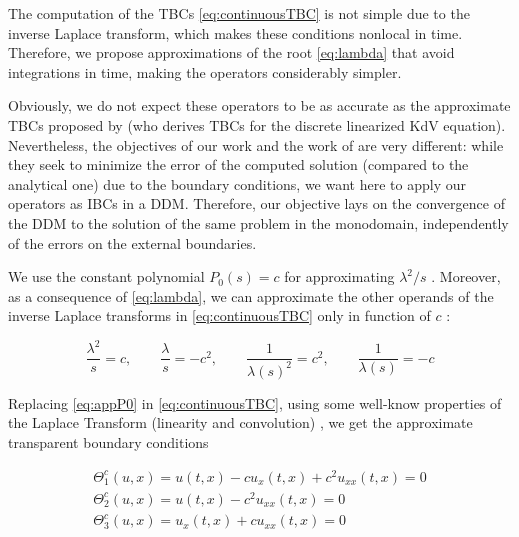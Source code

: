 \indent The computation of the TBCs \eqref{eq:continuousTBC} is not simple due to the inverse Laplace transform, which makes these conditions nonlocal in time. Therefore, we propose approximations of the root \eqref{eq:lambda} that avoid integrations in time, making the operators considerably simpler.

\indent Obviously,  \added[id=2017] we do not expect these operators to be as accurate as the approximate TBCs proposed by \cite{besse2015} (who derives TBCs for the discrete linearized KdV equation). Nevertheless, the objectives of our work and the work of \cite{besse2015} are very different: while they seek to minimize the error of the computed solution (compared to the analytical one) due to the boundary conditions, we want here to apply our  operators as IBCs in a DDM. Therefore, our objective lays on the convergence of the DDM to the solution of the same problem in the monodomain, independently of the errors on the external boundaries. 

\indent We use the constant polynomial $P_0(s) = c$ for approximating $\lambda^2/s$ . Moreover, as a consequence of \eqref{eq:lambda}, we can approximate the other operands of the inverse Laplace transforms in \eqref{eq:continuousTBC} only in function of $c$ :

\begin{equation}
	\label{eq:appP0}
	\frac{\lambda^2}{s}  = c, \qquad
	\frac{\lambda}{s}  = -c^2, \qquad
	\frac{1}{\lambda(s)^2}  = c^2, \qquad 
	 \frac{1}{\lambda(s)}  = -c 
\end{equation}

\indent Replacing \eqref{eq:appP0} in \eqref{eq:continuousTBC}, using some well-know properties of the Laplace Transform (linearity and convolution) , we get the approximate transparent boundary conditions

\begin{equation}
  \label{eq:appTBCP0}
    \begin{gathered}
        \Theta_1^{c}(u,x) = u(t,x) - c u_x(t,x)  + c^2  u_{xx}(t,x) = 0 \\
        \Theta_2^{c}(u,x) =  u(t,x) - c^2    u_{xx}(t,x) = 0\\
        \Theta_3^{c} (u,x)= u_x(t,x) + c u_{xx}(t,x)  = 0
    \end{gathered}
\end{equation}

